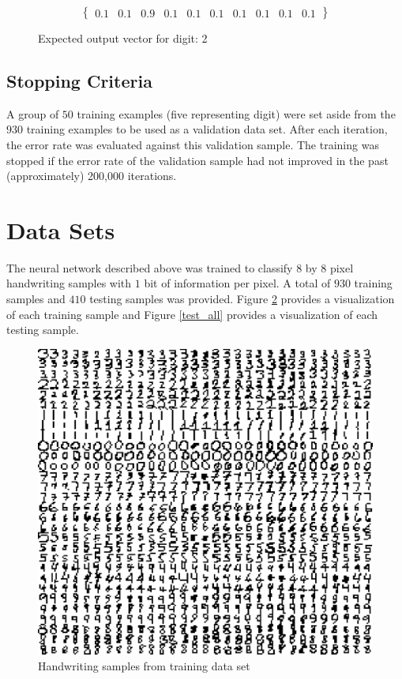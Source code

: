 \documentclass{article}
\begin{document}
\begin{figure}
\[ \begin{Bmatrix} 0.1 & 0.1 & 0.9 & 0.1 & 0.1 & 0.1 & 0.1 & 0.1 & 0.1 & 0.1 \end{Bmatrix} \]
\caption{Expected output vector for digit: 2}
\label{expected1}
\end{figure}

\subsection{Stopping Criteria}

A group of \(50\) training examples (five representing digit) were set aside from the \(930\) training examples to be used as a validation data set. After each iteration, the error rate was evaluated against this validation sample. The training was stopped if the error rate of the validation sample had not improved in the past (approximately) 200,000 iterations.

\section{Data Sets}\label{Dataset}

The neural network described above was trained to classify \(8\) by \(8\) pixel handwriting samples with \(1\) bit of information per pixel. A total of \(930\) training samples and \(410\) testing samples was provided. Figure \ref{train_all} provides a visualization of each training sample and Figure \ref{test_all} provides a visualization of each testing sample.

\begin{figure}
\centering
\includegraphics[width=1.00\textwidth]{data/visualization/all_training_data.png}
\caption{Handwriting samples from training data set}
\label{train_all}
\end{figure}
\end{document}
